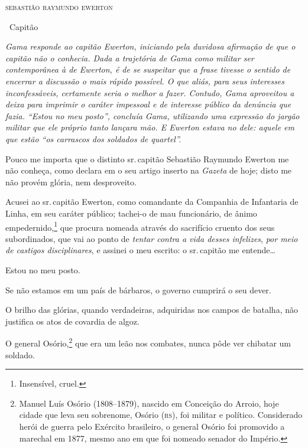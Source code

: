 \hfill\textsc{sebastião raymundo ewerton}

\hfill\ Capitão


\begin{resumo}
\emph{Gama responde ao capitão Ewerton, iniciando pela duvidosa
afirmação de que o capitão não o conhecia. Dada a trajetória de Gama
como militar ser contemporânea à de Ewerton, é de se suspeitar que a
frase tivesse o sentido de encerrar a discussão o mais rápido possível.
O que aliás, para seus interesses inconfessáveis, certamente seria o
melhor a fazer. Contudo, Gama aproveitou a deixa para imprimir o caráter
impessoal e de interesse público da denúncia que fazia. ``Estou no meu
posto'', concluía Gama, utilizando uma expressão do jargão militar que
ele próprio tanto lançara mão. E Ewerton estava no dele: aquele em que
estão ``os carrascos dos soldados de quartel''. }
\end{resumo}

Pouco me importa que o distinto sr.\,capitão Sebastião Raymundo Ewerton
me não conheça, como declara em o seu artigo inserto na \emph{Gazeta} de
hoje; disto me não provém glória, nem desproveito.

Acusei ao sr.\,capitão Ewerton, como comandante da Companhia de
Infantaria de Linha, em seu caráter público; tachei-o de mau
funcionário, de ânimo empedernido,\footnote{Insensível, cruel.} que
procura nomeada através do sacrifício cruento dos seus subordinados, que
vai ao ponto de \emph{tentar contra a vida desses infelizes}, \emph{por
meio de castigos disciplinares}, e assinei o meu escrito: o sr.\,capitão
me entende\ldots{}

Estou no meu posto.

Se não estamos em um país de bárbaros, o governo cumprirá o seu dever.

O brilho das glórias, quando verdadeiras, adquiridas nos campos de
batalha, não justifica os atos de covardia de algoz.

O general Osório,\footnote{Manuel Luís Osório (1808--1879), nascido em
  Conceição do Arroio, hoje cidade que leva seu sobrenome, Osório (\textsc{rs}),
  foi militar e político. Considerado herói de guerra pelo Exército
  brasileiro, o general Osório foi promovido a marechal em 1877, mesmo
  ano em que foi nomeado senador do Império.}
que era um leão nos
combates, nunca pôde ver chibatar um soldado.

